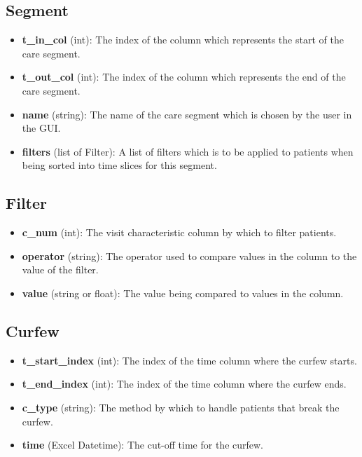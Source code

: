 \documentclass{article}
\begin{document}
\subsection*{Segment}

\begin{itemize}
	\item \textbf{t\_in\_col} (int): The index of the column which represents the start of the care segment.
	\item \textbf{t\_out\_col} (int): The index of the column which represents the end of the care segment.
	\item \textbf{name} (string): The name of the care segment which is chosen by the user in the GUI.
	\item \textbf{filters} (list of Filter): A list of filters which is to be applied to patients when being sorted into time slices for this segment.
\end{itemize}

\subsection*{Filter}

\begin{itemize}
	\item \textbf{c\_num} (int): The visit characteristic column by which to filter patients.
	\item \textbf{operator} (string): The operator used to compare values in the column to the value of the filter.
	\item \textbf{value} (string or float): The value being compared to values in the column.
\end{itemize}

\subsection*{Curfew}

\begin{itemize}
	\item \textbf{t\_start\_index} (int): The index of the time column where the curfew starts.
	\item \textbf{t\_end\_index} (int): The index of the time column where the curfew ends.
	\item \textbf{c\_type} (string): The method by which to handle patients that break the curfew.
	\item \textbf{time} (Excel Datetime): The cut-off time for the curfew.
\end{itemize}
\end{document}
